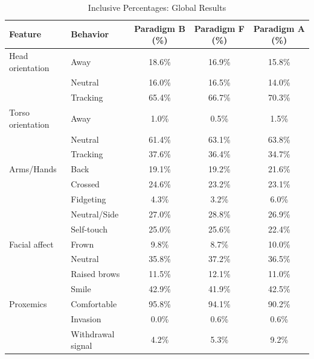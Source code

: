 \begin{table}[ht]
\centering
\caption{Inclusive Percentages: Global Results}
\label{tab:inclusive_pct_global}
\begin{tabular}{llccc}
\toprule
Feature & Behavior & Paradigm B (\%) & Paradigm F (\%) & Paradigm A (\%) \\
\midrule
Head orientation & Away & 18.6\% & 16.9\% & 15.8\% \\
~ & Neutral & 16.0\% & 16.5\% & 14.0\% \\
~ & Tracking & 65.4\% & 66.7\% & 70.3\% \\
\midrule
Torso orientation & Away & 1.0\% & 0.5\% & 1.5\% \\
~ & Neutral & 61.4\% & 63.1\% & 63.8\% \\
~ & Tracking & 37.6\% & 36.4\% & 34.7\% \\
\midrule
Arms/Hands & Back & 19.1\% & 19.2\% & 21.6\% \\
~ & Crossed & 24.6\% & 23.2\% & 23.1\% \\
~ & Fidgeting & 4.3\% & 3.2\% & 6.0\% \\
~ & Neutral/Side & 27.0\% & 28.8\% & 26.9\% \\
~ & Self-touch & 25.0\% & 25.6\% & 22.4\% \\
\midrule
Facial affect & Frown & 9.8\% & 8.7\% & 10.0\% \\
~ & Neutral & 35.8\% & 37.2\% & 36.5\% \\
~ & Raised brows & 11.5\% & 12.1\% & 11.0\% \\
~ & Smile & 42.9\% & 41.9\% & 42.5\% \\
\midrule
Proxemics & Comfortable & 95.8\% & 94.1\% & 90.2\% \\
~ & Invasion & 0.0\% & 0.6\% & 0.6\% \\
~ & Withdrawal signal & 4.2\% & 5.3\% & 9.2\% \\
\bottomrule
\end{tabular}
\end{table}